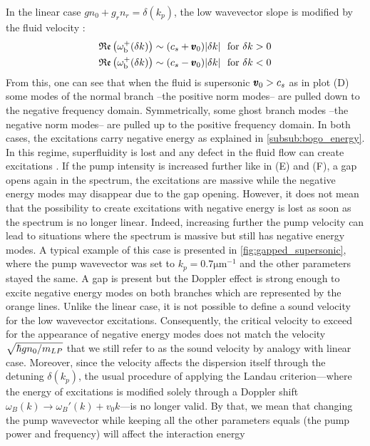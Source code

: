In the linear case $gn_0+g_rn_r=\delta(k_p)$, the low wavevector slope is modified by the fluid velocity :
\begin{equation}
    \begin{aligned}
    \mathfrak{Re}\left(\omega_{\mathrm{b}}^+(\delta k)\right)& \sim (c_s + \pmb{v}_0)\abs{\delta k} \ \ \mathrm{for} \ \delta k > 0 \\
    \mathfrak{Re}\left(\omega_{\mathrm{b}}^+(\delta k)\right)& \sim (c_s - \pmb{v}_0)\abs{\delta k} \ \ \mathrm{for} \ \delta k < 0
    \end{aligned}
\end{equation}
From this, one can see that when the fluid is supersonic $\pmb{v}_0>c_s$ as in plot (D) some modes of the normal branch --the positive norm modes-- are pulled down to the negative frequency domain. Symmetrically, some ghost branch modes --the negative norm modes-- are pulled up to the positive frequency domain.
In both cases, the excitations carry negative energy as explained in \autoref{subsub:bogo_energy}. In this regime, superfluidity is lost and any defect in the fluid flow 
can create excitations \cite{Amo_fluidlightexp_2009}. If the pump intensity is increased further like in (E) and (F), a gap opens again in the spectrum, the excitations are massive while
the negative energy modes may disappear due to the gap opening. However, it does not mean that the possibility to create excitations with negative energy 
is lost as soon as the spectrum is no longer linear. Indeed, increasing further the pump velocity can lead to situations where the spectrum is massive but still has negative energy modes.
A typical example of this case is presented in \autoref{fig:gapped_supersonic}, where the pump wavevector was set to $k_p=0.7 \mathrm{\mu m^{-1}}$ and the other parameters stayed the same. 
A gap is present but the Doppler effect is strong enough to excite negative energy modes on both branches which are represented by the orange lines. Unlike the linear case, it is not possible to define 
a sound velocity for the low wavevector excitations. Consequently, the critical velocity to exceed for the appearance of negative energy modes does not match the velocity $\sqrt{\hbar g n_0/m_{LP}}$ that we still refer to as the sound velocity
by analogy with linear case. Moreover, since the velocity affects the dispersion itself through the detuning $\delta(k_p)$, the usual procedure of applying the Landau criterion---where the energy of excitations is modified solely through a Doppler shift $\omega_B(k) \to \omega_B'(k) + v_0 k$---is no longer valid. By that, we mean that changing the pump wavevector while keeping all the other parameters equals (the pump power and frequency) will affect the interaction energy 
